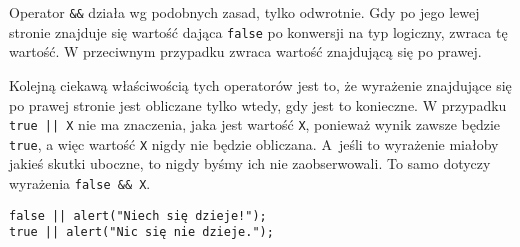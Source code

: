     
Operator \texttt{\&\&}\index{\&\&} działa wg podobnych zasad, tylko odwrotnie. Gdy po jego lewej stronie znajduje się wartość dająca \texttt{false} po konwersji na typ logiczny, zwraca tę wartość. W przeciwnym przypadku zwraca wartość znajdującą się po prawej.

    
Kolejną ciekawą właściwością tych operatorów jest to, że wyrażenie znajdujące się po prawej stronie jest obliczane tylko wtedy, gdy jest to konieczne. W przypadku \texttt{true || X} nie ma znaczenia, jaka jest wartość \texttt{X}, ponieważ wynik zawsze będzie \texttt{true}, a więc wartość \texttt{X} nigdy nie będzie obliczana. A~jeśli to wyrażenie miałoby jakieś skutki uboczne, to nigdy byśmy ich nie zaobserwowali. To samo dotyczy wyrażenia \texttt{false \&\& X}.

\begin{verbatim} 
false || alert("Niech się dzieje!");
true || alert("Nic się nie dzieje.");
\end{verbatim}